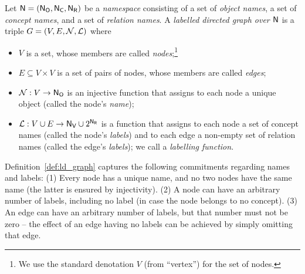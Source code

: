 %
\begin{definition}
  \label{def:ld_graph}
  Let $\textup{\textsf{N}}=(\mathsf{N}_\mathsf{O},\mathsf{N}_\mathsf{C},\mathsf{N}_\mathsf{R})$ be a \emph{namespace} consisting of a set \NO of \emph{object names}, a set \NC of \emph{concept names}, and a set \NR of \emph{relation names}.
  A \emph{labelled directed graph over $\textup{\textsf{N}}$} is a triple $G = (V,E,\mathcal{N},\mathcal{L})$
  where
  \begin{itemize}
    \item
      $V$ is a set, whose members are called \emph{nodes};\footnote{%
        We use the standard denotation $V$ (from \enquote{vertex}) for the set of nodes.%
      }      
    \item 
      $E \subseteq V \times V$ is a set of pairs of nodes, whose members are called \emph{edges};
    \item
      $\mathcal{N} : V \to \mathsf{N}_\mathsf{O}$ is an injective function that assigns
      to each node a unique object (called the node's \emph{name});
    \item
      $\mathcal{L} : V \cup E \to \mathsf{N}_\mathsf{V} \cup 2^{\mathsf{N}_\mathsf{R}}$ is a function that assigns 
      to each node a set of concept names (called the node's \emph{labels}) and
      to each edge a non-empty set of relation names (called the edge's \emph{labels});
      we call \Lmc a \emph{labelling function}.
  \end{itemize}
\end{definition}
%
Definition~\ref{def:ld_graph} captures the following commitments regarding names and labels:
%
(1) Every node has a unique name, and no two nodes have the same name (the latter is ensured by injectivity).
(2) A node can have an arbitrary number of labels, including no label (in case the node belongs to no concept).
(3) An edge can have an arbitrary number of labels, but that number must not be zero --
the effect of an edge having no labels can be achieved by simply omitting that edge.

